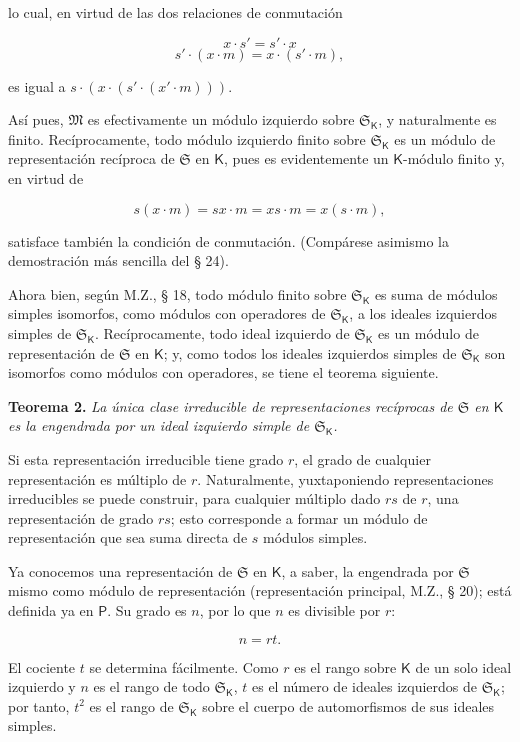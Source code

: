 lo cual, en virtud de las dos relaciones de conmutación

\[
x\cdot s'=s'\cdot x
\]
\[
s'\cdot(x\cdot m)=x\cdot(s'\cdot m),
\]

es igual a \(s\cdot(x\cdot(s'\cdot(x'\cdot m)))\).

Así pues, \(\mathfrak M\) es efectivamente un módulo izquierdo sobre \(\mathfrak S_{\mathsf K}\), y naturalmente es finito. Recíprocamente, todo módulo izquierdo finito sobre \(\mathfrak S_{\mathsf K}\) es un módulo de representación recíproca de \(\mathfrak S\) en \(\mathsf K\), pues es evidentemente un \(\mathsf K\)-módulo finito y, en virtud de

\[
s(x\cdot m)=sx\cdot m=xs\cdot m=x(s\cdot m),
\]

satisface también la condición de conmutación. (Compárese asimismo la demostración más sencilla del § 24).

Ahora bien, según M.Z., § 18, todo módulo finito sobre \(\mathfrak S_{\mathsf K}\) es suma de módulos simples isomorfos, como módulos con operadores de \(\mathfrak S_{\mathsf K}\), a los ideales izquierdos simples de \(\mathfrak S_{\mathsf K}\). Recíprocamente, todo ideal izquierdo de \(\mathfrak S_{\mathsf K}\) es un módulo de representación de \(\mathfrak S\) en \(\mathsf K\); y, como todos los ideales izquierdos simples de \(\mathfrak S_{\mathsf K}\) son isomorfos como módulos con operadores, se tiene el teorema siguiente.

\textbf{Teorema 2.} \emph{La única clase irreducible de representaciones recíprocas de \(\mathfrak S\) en \(\mathsf K\) es la engendrada por un ideal izquierdo simple de \(\mathfrak S_{\mathsf K}\).}

Si esta representación irreducible tiene grado \(r\), el grado de cualquier representación es múltiplo de \(r\). Naturalmente, yuxtaponiendo representaciones irreducibles se puede construir, para cualquier múltiplo dado \(rs\) de \(r\), una representación de grado \(rs\); esto corresponde a formar un módulo de representación que sea suma directa de \(s\) módulos simples.

Ya conocemos una representación de \(\mathfrak S\) en \(\mathsf K\), a saber, la engendrada por \(\mathfrak S\) mismo como módulo de representación (representación principal, M.Z., § 20); está definida ya en \(\mathsf P\). Su grado es \(n\), por lo que \(n\) es divisible por \(r\):

\[
n=rt.
\]

El cociente \(t\) se determina fácilmente. Como \(r\) es el rango sobre \(\mathsf K\) de un solo ideal izquierdo y \(n\) es el rango de todo \(\mathfrak S_{\mathsf K}\), \(t\) es el número de ideales izquierdos de \(\mathfrak S_{\mathsf K}\); por tanto, \(t^2\) es el rango de \(\mathfrak S_{\mathsf K}\) sobre el cuerpo de automorfismos de sus ideales simples.

